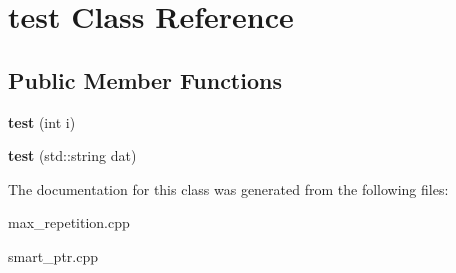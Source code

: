 \hypertarget{classtest}{}\section{test Class Reference}
\label{classtest}
\subsection*{Public Member Functions}
\begin{DoxyCompactItemize}
\item 
{\bfseries test} (int i)\hypertarget{classtest_a8df6f296cc1221af71cdd68db447bcc6}{}\label{classtest_a8df6f296cc1221af71cdd68db447bcc6}

\item 
{\bfseries test} (std\+::string dat)\hypertarget{classtest_a6ff209783c88e98848c444617fd64ae3}{}\label{classtest_a6ff209783c88e98848c444617fd64ae3}

\end{DoxyCompactItemize}


The documentation for this class was generated from the following files\+:\begin{DoxyCompactItemize}
\item 
max\+\_\+repetition.\+cpp\item 
smart\+\_\+ptr.\+cpp\end{DoxyCompactItemize}
